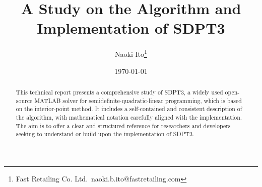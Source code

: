 \documentclass{jsarticle}
\title{A Study on the Algorithm and Implementation of SDPT3}
\author{Naoki Ito\footnote{Fast Retailing Co. Ltd.\ naoki.b.ito@fastretailing.com}}
\date{\today}
\begin{document}
\maketitle
\begin{abstract}
This technical report presents a comprehensive study of SDPT3, a widely used open-source MATLAB solver for semidefinite-quadratic-linear programming, which is based on the interior-point method.
It includes a self-contained and consistent description of the algorithm, with mathematical notation carefully aligned with the implementation. 
The aim is to offer a clear and structured reference for researchers and developers seeking to understand or build upon the implementation of SDPT3.
\end{abstract}

\tableofcontents


\end{document}
